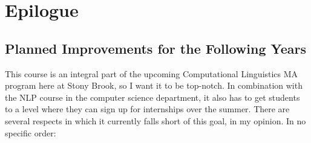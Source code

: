 \chapter{Epilogue}
\label{cha:Epilogue}

\section{Planned Improvements for the Following Years}

This course is an integral part of the upcoming Computational Linguistics MA program here at Stony Brook, so I want it to be top-notch.
In combination with the NLP course in the computer science department, it also has to get students to a level where they can sign up for internships over the summer.
There are several respects in which it currently falls short of this goal, in my opinion.
In no specific order:
%
